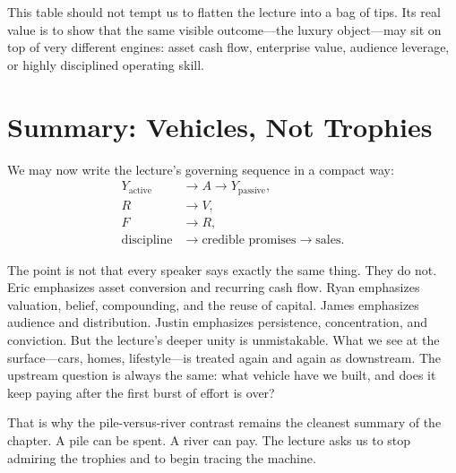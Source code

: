 This table should not tempt us to flatten the lecture into a bag of tips. Its real value is to show that the same visible outcome---the luxury object---may sit on top of very different engines: asset cash flow, enterprise value, audience leverage, or highly disciplined operating skill.

\section{Summary: Vehicles, Not Trophies}

We may now write the lecture's governing sequence in a compact way:
\begin{align}
Y_{\mathrm{active}} &\longrightarrow A \longrightarrow Y_{\mathrm{passive}},\\
R &\longrightarrow V,\\
F &\longrightarrow R,\\
\text{discipline} &\longrightarrow \text{credible promises} \longrightarrow \text{sales}.
\end{align}

The point is not that every speaker says exactly the same thing. They do not. Eric emphasizes asset conversion and recurring cash flow. Ryan emphasizes valuation, belief, compounding, and the reuse of capital. James emphasizes audience and distribution. Justin emphasizes persistence, concentration, and conviction. But the lecture's deeper unity is unmistakable. What we see at the surface---cars, homes, lifestyle---is treated again and again as downstream. The upstream question is always the same: what vehicle have we built, and does it keep paying after the first burst of effort is over?

That is why the pile-versus-river contrast remains the cleanest summary of the chapter. A pile can be spent. A river can pay. The lecture asks us to stop admiring the trophies and to begin tracing the machine.